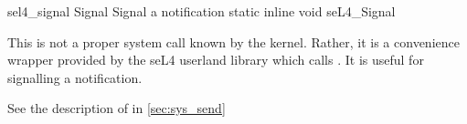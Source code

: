 %
%
%
%

\apidoc
{sel4_signal}
{Signal}
{Signal a notification}
{static inline void seL4\_Signal}
{
}
{\noret}
{
This is not a proper system call
known by the kernel. Rather, it is a convenience
wrapper provided by the seL4 userland library which calls
. It is
useful for signalling a notification.

See the description of  in \autoref{sec:sys_send}
}
